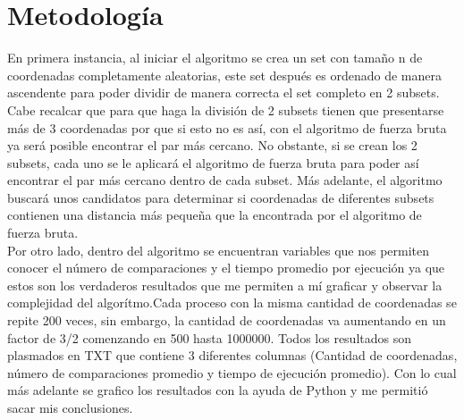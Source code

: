 \section{Metodología}
En primera instancia, al iniciar el algoritmo se crea un set con tamaño n de coordenadas completamente aleatorias, este set después es ordenado de manera ascendente para poder dividir de manera correcta el set completo en 2 subsets.
Cabe recalcar que para que haga la división de 2 subsets tienen que presentarse más de 3 coordenadas por que si esto no es así, con el algoritmo de fuerza bruta ya será posible encontrar el par más cercano. No obstante, si se crean los 2 subsets, cada uno se le aplicará el algoritmo de fuerza bruta para poder así encontrar el par más cercano dentro de cada subset. Más adelante, el algoritmo buscará unos candidatos para determinar si coordenadas de diferentes subsets contienen una distancia más pequeña que la encontrada por el algoritmo de fuerza bruta. \\

Por otro lado, dentro del algoritmo se encuentran variables que nos permiten conocer el número de comparaciones y el tiempo promedio por ejecución ya que estos son los verdaderos resultados que me permiten a mí graficar y observar la complejidad del algorítmo.Cada proceso con la misma cantidad de coordenadas se repite 200 veces, sin embargo, la cantidad de coordenadas va aumentando en un factor de 3/2 comenzando en 500 hasta 1000000. Todos los resultados son plasmados en TXT que contiene 3 diferentes columnas (Cantidad de coordenadas, número de comparaciones promedio y tiempo de ejecución promedio). Con lo cual más adelante se grafico los resultados con la ayuda de Python y me permitió sacar mis conclusiones.